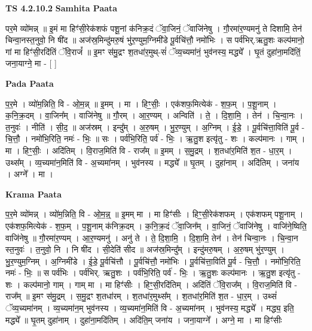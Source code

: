 \documentclass[17pt]{extarticle}
\begin{document}
\textbf{TS 4.2.10.2 } \newline
\textbf{Samhita Paata} \newline

पर॒मे व्यो॑मन्न् ॥ इ॒मं मा हिꣳ॑सी॒रेक॑शफं पशू॒नां क॑निक्र॒दं ॅवा॒जिनं॒ ॅवाजि॑नेषु । गौ॒रमा॑र॒ण्यमनु॑ ते दिशामि॒ तेन॑ चिन्वा॒नस्त॒नुवो॒ नि षी॑द ॥ अज॑स्र॒मिन्दु॑मरु॒षं भु॑र॒ण्युम॒ग्निमी॑डे पू॒र्वचि॑त्तौ॒ नमो॑भिः । स पर्व॑भिर्.ऋतु॒शः कल्प॑मानो॒ गां मा हिꣳ॑सी॒रदि॑तिं ॅवि॒राजं᳚ ॥ इ॒मꣳ स॑मु॒द्रꣳ श॒तधा॑र॒मुथ्-सं॑ ॅव्य॒च्यमा॑नं॒ भुव॑नस्य॒ मद्ध्ये᳚ । घृ॒तं दुहा॑ना॒मदि॑तिं॒ जना॒याग्ने॒ मा - [  ] \newline

\textbf{Pada Paata} \newline

प॒र॒मे । व्यो॑म॒न्निति॒ वि - ओ॒म॒न्न् ॥ इ॒मम् । मा । हिꣳ॒॒सीः॒ । एक॑शफ॒मित्येक॑ - श॒फ॒म् । प॒शू॒नाम् । क॒नि॒क्र॒दम् । वा॒जिन᳚म् । वाजि॑नेषु ॥ गौ॒रम् । आ॒र॒ण्यम् । अन्विति॑ । ते॒ । दि॒शा॒मि॒ । तेन॑ । चि॒न्वा॒नः । त॒नुवः॑ । नीति॑ । सी॒द॒ ॥ अज॑स्रम् । इन्दु᳚म् । अ॒रु॒षम् । भु॒र॒ण्युम् । अ॒ग्निम् । ई॒डे॒ । पू॒र्वचि॑त्ता॒विति॑ पू॒र्व - चि॒त्तौ॒ । नमो॑भि॒रिति॒ नमः॑ - भिः॒ ॥ सः । पर्व॑भि॒रिति॒ पर्व॑ - भिः॒ । ऋ॒तु॒श इत्यृ॑तु - शः । कल्प॑मानः । गाम् । मा । हिꣳ॒॒सीः॒ । अदि॑तिम् । वि॒राज॒मिति॑ वि - राज᳚म् ॥ इ॒मम् । स॒मु॒द्रम् । श॒तधा॑र॒मिति॑ श॒त - धा॒र॒म् । उथ्स᳚म् । व्य॒च्यमा॑न॒मिति॑ वि - अ॒च्यमा॑नम् । भुव॑नस्य । मद्ध्ये᳚ ॥ घृ॒तम् । दुहा॑नाम् । अदि॑तिम् । जना॑य । अग्ने᳚ । मा ।  \newline


\textbf{Krama Paata} \newline

प॒र॒मे व्यो॑मन्न् । व्यो॑म॒न्निति॒ वि - ओ॒म॒न्न्॒ ॥ इ॒मम् मा । मा हिꣳ॑सीः । हिꣳ॒॒सी॒रेक॑शफम् । एक॑शफम् पशू॒नाम् । एक॑शफ॒मित्येक॑ - श॒फ॒म् । प॒शू॒नाम् क॑निक्र॒दम् । क॒नि॒क्र॒दं ॅवा॒जिन᳚म् । वा॒जिनं॒ ॅवाजि॑नेषु । वाजि॑ने॒ष्विति॒ वाजि॑नेषु ॥ गौ॒रमा॑र॒ण्यम् । आ॒र॒ण्यमनु॑ । अनु॑ ते । ते॒ दि॒शा॒मि॒ । दि॒शा॒मि॒ तेन॑ । तेन॑ चिन्वा॒नः । चि॒न्वा॒न स्त॒नुवः॑ । त॒नुवो॒ नि । नि षी॑द । सी॒देति॑ सीद ॥ अज॑स्र॒मिन्दु᳚म् । इन्दु॑मरु॒षम् । अ॒रु॒षम् भु॑र॒ण्युम् । भु॒र॒ण्युम॒ग्निम् । अ॒ग्निमी॑डे । ई॒डे॒ पू॒र्वचि॑त्तौ । पू॒र्वचि॑त्तौ॒ नमो॑भिः । पू॒र्वचि॑त्ता॒विति॑ पू॒र्व - चि॒त्तौ॒ । नमो॑भि॒रिति॒ नमः॑ - भिः॒ ॥ स पर्व॑भिः । पर्व॑भिर्. ऋतु॒शः । पर्व॑भि॒रिति॒ पर्व॑ - भिः॒ । ऋ॒तु॒शः कल्प॑मानः । ऋ॒तु॒श इत्यृ॑तु - शः । कल्प॑मानो॒ गाम् । गाम् मा । मा हिꣳ॑सीः । हिꣳ॒॒सी॒रदि॑तिम् । अदि॑तिं ॅवि॒राज᳚म् । वि॒राज॒मिति॑ वि - राज᳚म् ॥ इ॒मꣳ स॑मु॒द्रम् । स॒मु॒द्रꣳ श॒तधा॑रम् । श॒तधा॑र॒मुथ्स᳚म् । श॒तधा॑र॒मिति॑ श॒त - धा॒र॒म् । उथ्सं॑ ॅव्य॒च्यमा॑नम् । व्य॒च्यमा॑न॒म् भुव॑नस्य । व्य॒च्यमा॑न॒मिति॑ वि - अ॒च्यमा॑नम् । भुव॑नस्य॒ मद्ध्ये᳚ । मद्ध्य॒ इति॒ मद्ध्ये᳚ ॥ घृ॒तम् दुहा॑नाम् । दुहा॑ना॒मदि॑तिम् । अदि॑ति॒म् जना॑य । जना॒याग्ने᳚ । अग्ने॒ मा । मा हिꣳ॑सीः \newline
\end{document}
